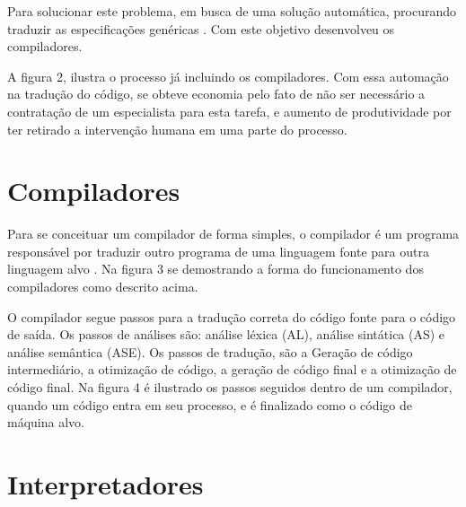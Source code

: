 \documentclass[12pt,oneside,a4paper,chapter=TITLE,section=TITLE,sumario=tradicional]{abntex2}
\begin{document}
\begin{figure}[htb]
\end{figure}

Para solucionar este problema, em busca de uma solução automática, procurando traduzir as especificações genéricas  \cite{ricarte2008}. Com este objetivo desenvolveu os compiladores.

A figura 2, ilustra o processo já incluindo os compiladores. Com essa automação na tradução do código, se obteve economia pelo fato de não ser necessário a contratação de um especialista para esta tarefa, e aumento de produtividade por ter retirado a intervenção humana em uma parte do processo. 

\begin{figure}[htb]
\end{figure}

\section{Compiladores}
\label{sec:compiladores}

Para se conceituar um compilador de forma simples, o compilador é um programa responsável por traduzir outro programa de uma linguagem fonte para outra linguagem alvo \cite{alfred1995}. Na figura 3 se demostrando a forma do funcionamento dos compiladores como descrito acima. 

\begin{figure}[htb]
\end{figure}

O compilador segue passos para a tradução correta do código fonte para o código de saída. Os passos de análises são: análise léxica (AL), análise sintática (AS) e análise semântica (ASE). Os passos de tradução, são a Geração de código intermediário, a otimização de código, a geração de código final e a otimização de código final. Na figura 4 é ilustrado os passos seguidos dentro de um compilador, quando um código entra em seu processo, e é finalizado como o código de máquina alvo. 

\section{Interpretadores}
\label{sec:interpretadores}
\end{document}
